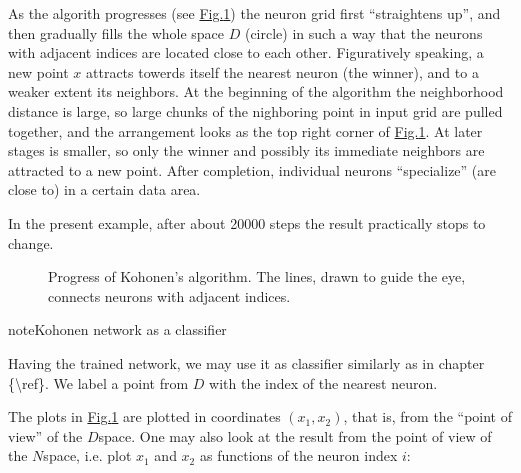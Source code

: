 \documentclass[letterpaper,10pt,english]{jupyterBook}
\let\sphinxpxdimen\pdfpxdimen\else\newdimen\sphinxpxdimen
\begin{document}
\sphinxAtStartPar
As the algorith progresses (see \hyperref[\detokenize{docs/som:kohstory-fig}]{Fig.\@ \ref{\detokenize{docs/som:kohstory-fig}}}) the neuron grid first “straightens up”, and then gradually fills the whole space \(D\) (circle) in such a way that the neurons with adjacent indices are located close to each other.
Figuratively speaking, a new point \(x\) attracts towerds itself the nearest neuron (the winner), and to a weaker extent its neighbors. At the beginning of the algorithm the neighborhood distance  is large, so large chunks of the nighboring point in input grid are pulled together, and the arrangement looks as the top right corner of \hyperref[\detokenize{docs/som:kohstory-fig}]{Fig.\@ \ref{\detokenize{docs/som:kohstory-fig}}}. At later stages  is smaller, so only the winner and possibly its immediate neighbors are attracted to a new point.
After completion, individual neurons “specialize” (are close to) in a certain data area.

\sphinxAtStartPar
In the present example, after about 20000 steps the result practically stops to change.

\begin{figure}[htbp]
\centering
\capstart

\noindent\sphinxincludegraphics[width=800\sphinxpxdimen]{{kaall}.png}
\caption{Progress of Kohonen’s algorithm. The lines, drawn to guide the eye, connects neurons with adjacent indices.}\label{\detokenize{docs/som:kohstory-fig}}\end{figure}

\begin{sphinxadmonition}{note}{Kohonen network as a classifier}

\sphinxAtStartPar
Having the trained network, we may use it as classifier similarly as in chapter \{\textbackslash{}ref\}. We label a point from \(D\) with the index of the nearest neuron.
\end{sphinxadmonition}

\sphinxAtStartPar
The plots in \hyperref[\detokenize{docs/som:kohstory-fig}]{Fig.\@ \ref{\detokenize{docs/som:kohstory-fig}}} are plotted in coordinates \((x_1,x_2)\), that is, from the “point of view” of the \(D\)\sphinxhyphen{}space. One may also look at the result from the point of view of the \(N\)\sphinxhyphen{}space, i.e. plot \(x_1\) and \(x_2\) as functions of the neuron index \(i\):

\noindent{}
\end{document}
